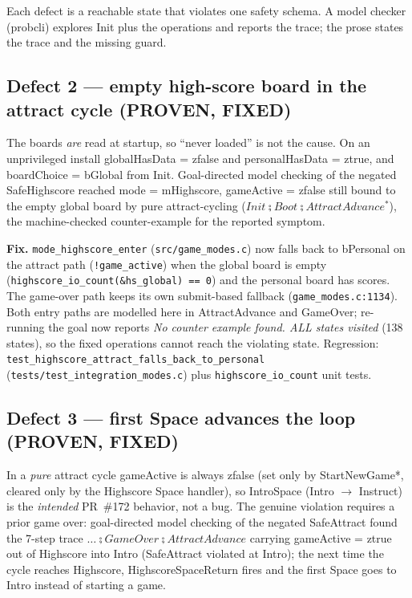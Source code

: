 \documentclass[a4paper,10pt,fleqn]{article}
\begin{document}
Each defect is a reachable state that violates one safety schema.  A
model checker (probcli) explores \textsf{Init} plus the operations and
reports the trace; the prose states the trace and the missing guard.

\subsection*{Defect 2 --- empty high-score board in the attract cycle
  (PROVEN, FIXED)}

The boards \emph{are} read at startup, so ``never loaded'' is not the
cause.  On an unprivileged install \textsf{globalHasData} =
\textsf{zfalse} and \textsf{personalHasData} = \textsf{ztrue}, and
\textsf{boardChoice} = \textsf{bGlobal} from \textsf{Init}.  Goal-directed
model checking of the negated \textsf{SafeHighscore} reached
\textsf{mode} = \textsf{mHighscore}, \textsf{gameActive} = \textsf{zfalse}
still bound to the empty global board by pure attract-cycling
($Init \semi Boot \semi AttractAdvance^{*}$), the machine-checked
counter-example for the reported symptom.

\textbf{Fix.} \texttt{mode\_highscore\_enter}
(\texttt{src/game\_modes.c}) now falls back to \textsf{bPersonal} on the
attract path (\texttt{!game\_active}) when the global board is empty
(\texttt{highscore\_io\_count(\&hs\_global) == 0}) and the personal board
has scores.  The game-over path keeps its own submit-based fallback
(\texttt{game\_modes.c:1134}).  Both entry paths are modelled here in
\textsf{AttractAdvance} and \textsf{GameOver}; re-running the goal now
reports \emph{No counter example found. ALL states visited} (138 states),
so the fixed operations cannot reach the violating state.  Regression:
\texttt{test\_highscore\_attract\_falls\_back\_to\_personal}
(\texttt{tests/test\_integration\_modes.c}) plus
\texttt{highscore\_io\_count} unit tests.

\subsection*{Defect 3 --- first Space advances the loop (PROVEN, FIXED)}

In a \emph{pure} attract cycle \textsf{gameActive} is always
\textsf{zfalse} (set only by \textsf{StartNewGame*}, cleared only by
the \textsf{Highscore} \textsf{Space} handler), so
\textsf{IntroSpace} (\textsf{Intro} $\to$ \textsf{Instruct}) is the
\emph{intended} PR~\#172 behavior, not a bug.  The genuine violation
requires a prior game over: goal-directed model checking of the negated
\textsf{SafeAttract} found the 7-step trace
$\dots \semi GameOver \semi AttractAdvance$ carrying
\textsf{gameActive} = \textsf{ztrue} out of \textsf{Highscore} into
\textsf{Intro} (\textsf{SafeAttract} violated at \textsf{Intro}); the
next time the cycle reaches \textsf{Highscore},
\textsf{HighscoreSpaceReturn} fires and the first \textsf{Space} goes to
\textsf{Intro} instead of starting a game.
\end{document}
